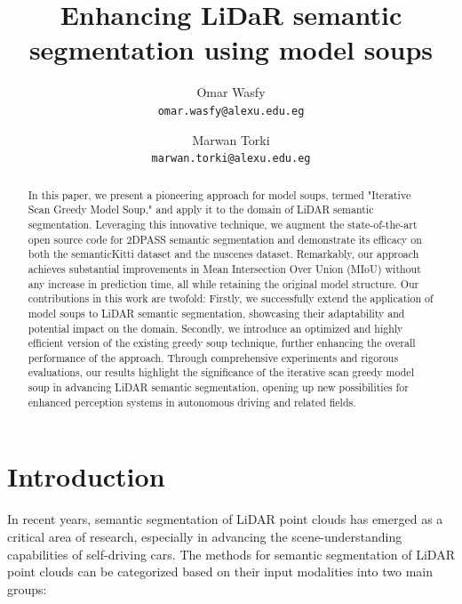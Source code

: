 \documentclass[10pt,twocolumn,letterpaper]{article}
\begin{document}
	
	\title{Enhancing LiDaR semantic segmentation using model soups }
	
	\author{ Omar Wasfy\\
		{\tt\small omar.wasfy@alexu.edu.eg}
	\and
	Marwan Torki\\
	{\tt\small marwan.torki@alexu.edu.eg}
}
\maketitle

\begin{abstract}
	In this paper, we present a pioneering approach for model soups, termed "Iterative Scan Greedy Model Soup," and apply it to the domain of LiDAR semantic segmentation. Leveraging this innovative technique, we augment the state-of-the-art open source code for 2DPASS \cite{yan20222dpass} semantic segmentation and demonstrate its efficacy on both the semanticKitti dataset and the nuscenes dataset. Remarkably, our approach achieves substantial improvements in Mean Intersection Over Union (MIoU) without any increase in prediction time, all while retaining the original model structure.	Our contributions in this work are twofold: Firstly, we successfully extend the application of model soups to LiDAR semantic segmentation, showcasing their adaptability and potential impact on the domain. Secondly, we introduce an optimized and highly efficient version of the existing greedy soup technique, further enhancing the overall performance of the approach. Through comprehensive experiments and rigorous evaluations, our results highlight the significance of the iterative scan greedy model soup in advancing LiDAR semantic segmentation, opening up new possibilities for enhanced perception systems in autonomous driving and related fields.
\end{abstract}

\section{Introduction}
\label{sec:intro}

In recent years, semantic segmentation of LiDAR point clouds has emerged as a critical area of research, especially in advancing the scene-understanding capabilities of self-driving cars. The methods for semantic segmentation of LiDAR point clouds can be categorized based on their input modalities into two main groups:
\end{document}
